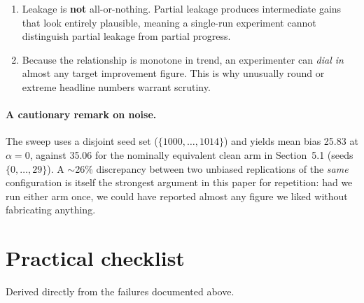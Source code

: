 \documentclass[11pt]{article}
\begin{document}
\begin{enumerate}
\item Leakage is \textbf{not} all-or-nothing. Partial leakage produces intermediate gains that look entirely plausible, meaning a single-run experiment cannot distinguish partial leakage from partial progress.
\item Because the relationship is monotone in trend, an experimenter can \emph{dial in} almost any target improvement figure. This is why unusually round or extreme headline numbers warrant scrutiny.
\end{enumerate}

\paragraph{A cautionary remark on noise.}
The sweep uses a disjoint seed set ($\{1000,\ldots,1014\}$) and yields mean bias 25.83 at $\alpha = 0$, against 35.06 for the nominally equivalent clean arm in Section~5.1 (seeds $\{0,\ldots,29\}$). A $\sim$26\% discrepancy between two unbiased replications of the \emph{same} configuration is itself the strongest argument in this paper for repetition: had we run either arm once, we could have reported almost any figure we liked without fabricating anything.

\section{Practical checklist}

Derived directly from the failures documented above.
\end{document}
